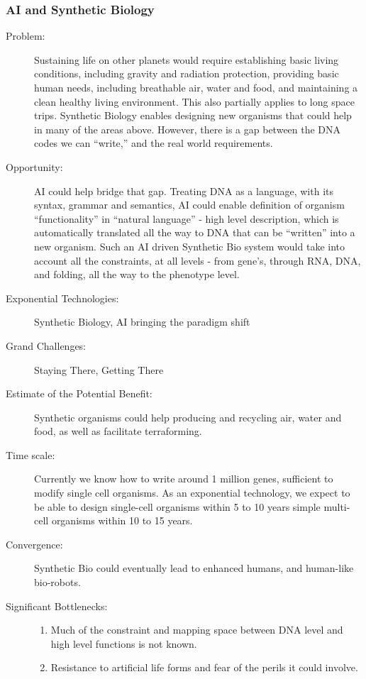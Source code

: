 \subsubsection{AI and Synthetic Biology} 
\begin{description}
\item[Problem:]
Sustaining life on other planets  would require establishing basic living conditions, including gravity  and radiation protection, providing basic human needs, including  breathable air, water and food, and maintaining a clean healthy living  environment. This also partially 
applies  to long space trips. Synthetic Biology enables designing new organisms  that could help in many of the areas above. However, there is a gap  between the DNA codes we can ``write,'' and the real world requirements.
 
 \item[Opportunity:] AI could help bridge that gap.  Treating DNA as a language, with its  syntax, grammar and semantics, AI could enable definition of organism  ``functionality'' in ``natural language'' - high level description, which is  automatically translated all the way to DNA that can be ``written'' into a  new organism. Such an AI driven Synthetic Bio system would take into  account all the constraints, at all levels - from gene's, through RNA,  DNA, and folding, all the way to the
 phenotype  level. 
 
 \item[Exponential  Technologies:]  Synthetic Biology, AI bringing the paradigm shift
 
 \item[Grand Challenges:] Staying There, Getting There
 
 \item[Estimate of the Potential  Benefit:] Synthetic organisms could help  producing and recycling air, water and food, as well as facilitate  terraforming.

 \item[Time scale:] Currently we know how to write  around 1 million genes, 
sufficient  to modify single cell organisms. As an exponential technology, we  expect to be able to design single-cell organisms within 5 to 10 years  simple multi-cell organisms within 10 to 15 years. 
 
\item[Convergence:] Synthetic Bio could eventually  lead to enhanced humans, and human-like bio-robots.

\item[Significant Bottlenecks:]
\hfill\begin{enumerate}
\item Much of the constraint and mapping  space between DNA level and high
 level  functions is not known.
 \item Resistance to artificial life  forms and fear of the perils it could involve.
 \end{enumerate}
 \end{description}
 
